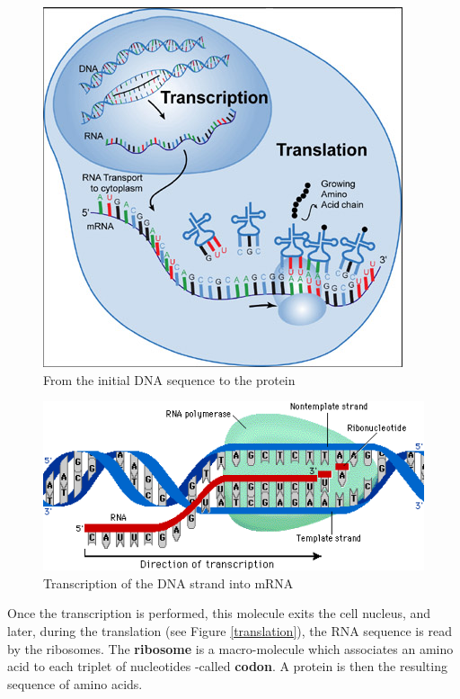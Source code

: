 \documentclass{report}
\begin{document}
\begin{figure}[H]
\centering
\includegraphics[scale=0.5]{illustrations/all.png}
\caption{From the initial DNA sequence to the protein}
\label{transcTransl}
\end{figure}

\begin{figure}[H]
\centering
\includegraphics[scale=0.5]{illustrations/transcription.png}
\caption{Transcription of the DNA strand into mRNA}
\label{transcription}
\end{figure}

Once the transcription is performed, this molecule exits the cell nucleus, and later, during the translation (see Figure \ref{translation}), the RNA sequence is read by the ribosomes. The \textbf{ribosome} is a macro-molecule which associates an amino acid to each triplet of nucleotides -called \textbf{codon}. A protein is then the resulting sequence of amino acids.\\ 
\end{document}
